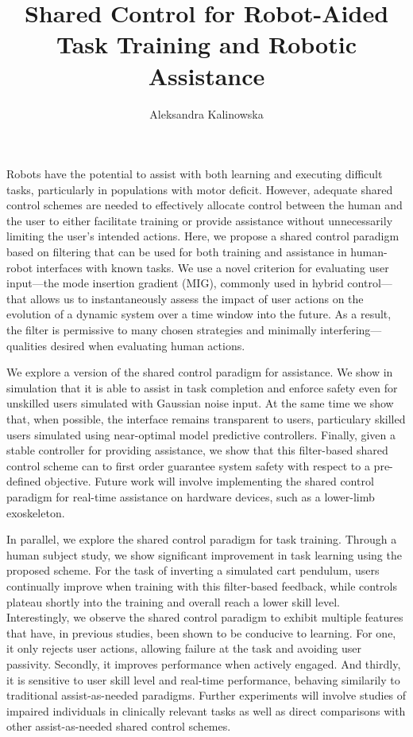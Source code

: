 \documentclass[12pt]{nuthesis}	%
\author{Aleksandra Kalinowska}
\title{Shared Control for Robot-Aided Task Training and Robotic Assistance}
\begin{document}
\frontmatter		%
\maketitle		%
\copyrightpage		%

\abstract		%
Robots have the potential to assist with both learning and executing difficult tasks, particularly in populations with motor deficit. However, adequate shared control schemes are needed to effectively allocate control between the human and the user to either facilitate training or provide assistance without unnecessarily limiting the user's intended actions. Here, we propose a shared control paradigm based on filtering that can be used for both training and assistance in human-robot interfaces with known tasks. We use a novel criterion for evaluating user input---the mode insertion gradient (MIG), commonly used in hybrid control---that allows us to instantaneously assess the impact of user actions on the evolution of a dynamic system over a time window into the future. As a result, the filter is permissive to many chosen strategies and minimally interfering---qualities desired when evaluating human actions.

We explore a version of the shared control paradigm for assistance. We show in simulation that it is able to assist in task completion and enforce safety even for unskilled users simulated with Gaussian noise input. At the same time we show that, when possible, the interface remains transparent to users, particulary skilled users simulated using near-optimal model predictive controllers. Finally, given a stable controller for providing assistance, we show that this filter-based shared control scheme can to first order guarantee system safety with respect to a pre-defined objective. Future work will involve implementing the shared control paradigm for real-time assistance on hardware devices, such as a lower-limb exoskeleton.

In parallel, we explore the shared control paradigm for task training. Through a human subject study, we show significant improvement in task learning using the proposed scheme. For the task of inverting a simulated cart pendulum, users continually improve when training with this filter-based feedback, while controls plateau shortly into the training and overall reach a lower skill level. Interestingly, we observe the shared control paradigm to exhibit multiple features that have, in previous studies, been shown to be conducive to learning. For one, it only rejects user actions, allowing failure at the task and avoiding user passivity. Secondly, it improves performance when actively engaged. And thirdly, it is sensitive to user skill level and real-time performance, behaving similarily to traditional assist-as-needed paradigms. Further experiments will involve studies of impaired individuals in clinically relevant tasks as well as direct comparisons with other assist-as-needed shared control schemes. 
\end{document}
